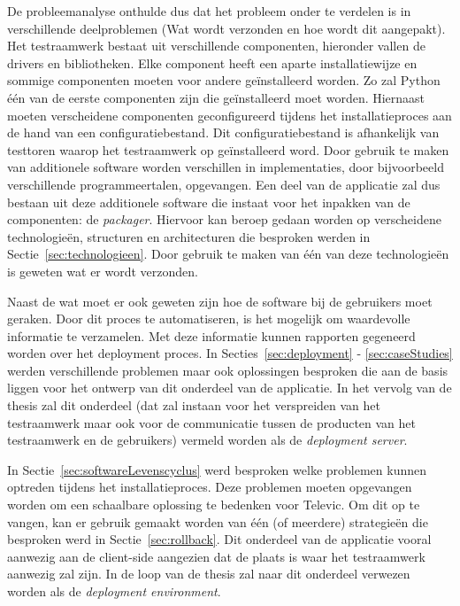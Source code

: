 De probleemanalyse onthulde dus dat het probleem onder te verdelen is in verschillende deelproblemen (Wat wordt verzonden en hoe wordt dit aangepakt).
Het testraamwerk bestaat uit verschillende componenten, hieronder vallen de drivers en bibliotheken.
Elke component heeft een aparte installatiewijze en sommige componenten moeten voor andere geïnstalleerd worden.
Zo zal Python één van de eerste componenten zijn die geïnstalleerd moet worden.
Hiernaast moeten verscheidene componenten geconfigureerd tijdens het installatieproces aan de hand van een configuratiebestand.
Dit configuratiebestand is afhankelijk van testtoren waarop het testraamwerk op geïnstalleerd word.
Door gebruik te maken van additionele software worden verschillen in implementaties, door bijvoorbeeld verschillende programmeertalen, opgevangen.
Een deel van de applicatie zal dus bestaan uit deze additionele software die instaat voor het inpakken van de componenten: de \emph{packager}.
Hiervoor kan beroep gedaan worden op verscheidene technologieën, structuren en architecturen die besproken werden in Sectie~\ref{sec:technologieen}.
Door gebruik te maken van één van deze technologieën is geweten wat er wordt verzonden.

Naast de wat moet er ook geweten zijn hoe de software bij de gebruikers moet geraken.
Door dit proces te automatiseren, is het mogelijk om waardevolle informatie te verzamelen.
Met deze informatie kunnen rapporten gegeneerd worden over het deployment proces.
In Secties~\ref{sec:deployment} - \ref{sec:caseStudies} werden verschillende problemen maar ook oplossingen besproken die aan de basis liggen voor het ontwerp van dit onderdeel van de applicatie. 
In het vervolg van de thesis zal dit onderdeel (dat zal instaan voor het verspreiden van het testraamwerk maar ook voor de communicatie tussen de producten van het testraamwerk en de gebruikers) vermeld worden als de \emph{deployment server}.

In Sectie~\vref{sec:softwareLevenscyclus} werd besproken welke problemen kunnen optreden tijdens het installatieproces.
Deze problemen moeten opgevangen worden om een schaalbare oplossing te bedenken voor Televic.
Om dit op te vangen, kan er gebruik gemaakt worden van één (of meerdere) strategieën die besproken werd in Sectie~\vref{sec:rollback}.
Dit onderdeel van de applicatie vooral aanwezig aan de client-side aangezien dat de plaats is waar het testraamwerk aanwezig zal zijn.
In de loop van de thesis zal naar dit onderdeel verwezen worden als de \emph{deployment environment}.

